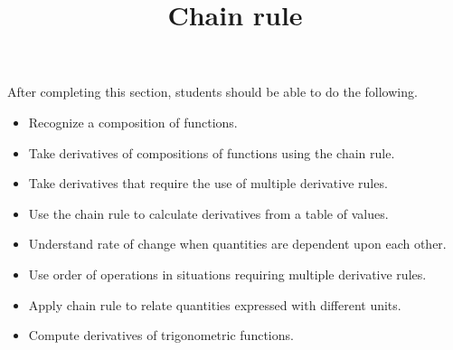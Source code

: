 \documentclass{ximera}
\title{Chain rule}
\begin{document}
\begin{abstract}
\end{abstract}

\maketitle

\begin{sectionOutcomes}

After completing this section, students should be able to do the following.

\begin{itemize}
	\item Recognize a composition of functions.
	\item Take derivatives of compositions of functions using the chain rule.
	\item Take derivatives that require the use of multiple derivative rules.
	\item Use the chain rule to calculate derivatives from a table of values.
	\item Understand rate of change when quantities are dependent upon each other.
	\item Use order of operations in situations requiring multiple derivative rules.
        \item Apply chain rule to relate quantities expressed with different units.
        \item Compute derivatives of trigonometric functions.
\end{itemize}

\end{sectionOutcomes}
\end{document}

